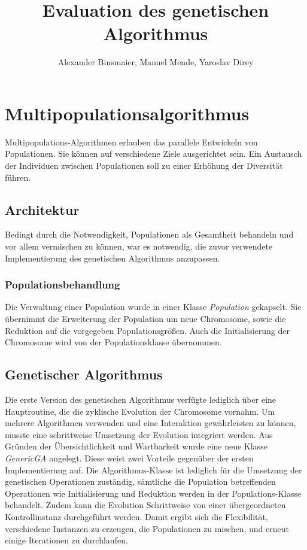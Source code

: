 \documentclass[12pt,a4paper]{article}
\author{Alexander Binsmaier, Manuel Mende, Yaroslav Direy}
\title{Evaluation des genetischen Algorithmus}
\begin{document}
\maketitle
\tableofcontents

\section{Multipopulationsalgorithmus}
Multipopulations-Algorithmen erlauben das parallele Entwickeln von Populationen. Sie können auf verschiedene Ziele ausgerichtet sein. Ein Austausch der Individuen zwischen Populationen soll zu einer Erhöhung der Diversität führen.

\subsection{Architektur}
Bedingt durch die Notwendigkeit, Populationen als Gesamtheit behandeln und vor allem vermischen zu können, war es notwendig, die zuvor verwendete Implementierung des genetischen Algorithmus anzupassen. 

\subsubsection{Populationsbehandlung}
Die Verwaltung einer Population wurde in einer Klasse \emph{Population} gekapselt. Sie übernimmt die Erweiterung der Population um neue Chromosome, sowie die Reduktion auf die vorgegeben Populationsgrößen. Auch die Initialisierung der Chromosome wird von der Populationsklasse übernommen.

\subsection{Genetischer Algorithmus}
Die erste Version des genetischen Algorithmus verfügte lediglich über eine Hauptroutine, die die zyklische Evolution der Chromosome vornahm. Um mehrere Algorithmen verwenden und eine Interaktion gewährleisten zu können, musste eine schrittweise Umsetzung der Evolution integriert werden. Aus Gründen der Übersichtlichkeit und Wartbarkeit wurde eine neue Klasse \emph{GenericGA} angelegt. Diese weist zwei Vorteile gegenüber der ersten Implementierung auf. Die Algorithmus-Klasse ist lediglich für die Umsetzung der genetischen Operationen zuständig, sämtliche die Population betreffenden Operationen wie Initialisierung und Reduktion werden in der Populations-Klasse behandelt. Zudem kann die Evolution Schrittweise von einer übergeordneten Kontrollinstanz durchgeführt werden. Damit ergibt sich die Flexibilität, verschiedene Instanzen zu erzeugen, die Populationen zu mischen, und erneut einige Iterationen zu durchlaufen.
\end{document}
